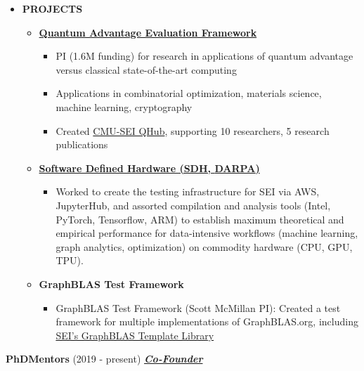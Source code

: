 \documentclass{article}
\newcommand{\employer}[3]{{ \textbf{#1} (#2) \underline{\textbf{\emph{#3}}}\\  }}
\begin{document}
\vspace{1mm}
    \begin{itemize}
      \item \textbf{PROJECTS}
      \begin{itemize}
        \item \href{https://www.sei.cmu.edu/our-work/quantum-computing/index.cfm}{\textbf{Quantum Advantage Evaluation Framework}}
        \begin{itemize}
          \item PI (1.6M funding) for research in applications of quantum advantage versus classical state-of-the-art computing
          \item Applications in combinatorial optimization, materials science, machine learning, cryptography
          \item Created \href{https://www.sei.cmu.edu/our-work/quantum-computing/index.cfm}{CMU-SEI QHub}, supporting 10 researchers, 5 research publications         
        \end{itemize}
        \item \textbf{\href{https://www.darpa.mil/program/software-defined-hardware}{Software Defined Hardware (SDH, \href{http://www.darpa.mil/default.aspx}{DARPA})}}
        \begin{itemize}
            \item Worked to create the testing infrastructure for SEI via AWS, JupyterHub, and assorted compilation and analysis tools (Intel, PyTorch, Tensorflow, ARM) to establish maximum theoretical and empirical performance for data-intensive workflows (machine learning, graph analytics, optimization) on commodity hardware (CPU, GPU, TPU). 
        \end{itemize}
        
        \item \textbf{GraphBLAS Test Framework}
        \begin{itemize}
            \item GraphBLAS Test Framework (Scott McMillan PI): 
Created a test framework for multiple implementations of GraphBLAS.org, including \href{https://github.com/cmu-sei/gbtl}{SEI’s GraphBLAS Template Library}

        \end{itemize}
        
        \end{itemize}
    \end{itemize}

\employer{PhDMentors}{2019 - present}{Co-Founder}
\end{document}
